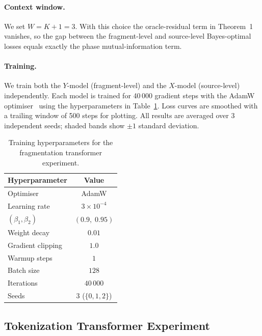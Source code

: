 \documentclass{article}
\theoremstyle{plain}
\theoremstyle{definition}
\theoremstyle{remark}
\begin{document}
\paragraph{Context window.}
We set $W = K+1 = 3$.
With this choice the oracle-residual term in Theorem~1 vanishes, so the
gap between the fragment-level and source-level Bayes-optimal losses equals
exactly the phase mutual-information term.

\paragraph{Training.}
We train both the $Y$-model (fragment-level) and the $X$-model
(source-level) independently.
Each model is trained for 40\,000 gradient steps with the AdamW
optimiser~\citep{loshchilov2019decoupled} using the hyperparameters in
Table~\ref{tab:train_frag}.
Loss curves are smoothed with a trailing window of 500 steps for plotting.
All results are averaged over 3 independent seeds; shaded bands show
$\pm 1$ standard deviation.

\begin{table}[h]
\centering
\caption{Training hyperparameters for the fragmentation transformer experiment.}
\label{tab:train_frag}
\small
\begin{tabular}{lc}
\toprule
\textbf{Hyperparameter} & \textbf{Value} \\
\midrule
Optimiser            & AdamW \\
Learning rate        & $3 \times 10^{-4}$ \\
$(\beta_1, \beta_2)$ & $(0.9,\; 0.95)$ \\
Weight decay         & $0.01$ \\
Gradient clipping    & $1.0$ \\
Warmup steps         & $1$ \\
Batch size           & $128$ \\
Iterations           & $40\,000$ \\
Seeds                & 3 \;($\{0,1,2\}$) \\
\bottomrule
\end{tabular}
\end{table}

\subsection{Tokenization Transformer Experiment}
\label{app:impl:tok}
\end{document}
